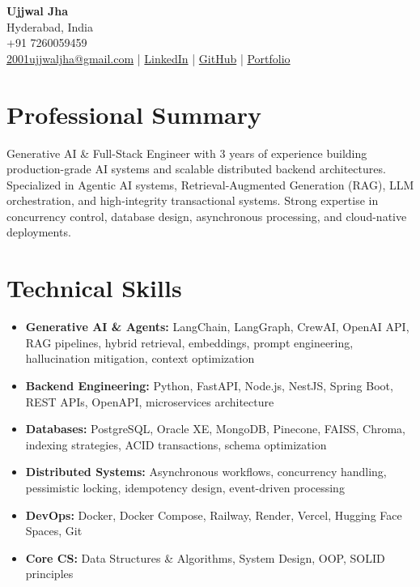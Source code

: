 \documentclass[letterpaper,11pt]{article}
\begin{document}

\begin{center}
    {\Huge \textbf{Ujjwal Jha}} \\ \vspace{6pt}
    Hyderabad, India \\
    +91 7260059459 \\
    \href{mailto:2001ujjwaljha@gmail.com}{2001ujjwaljha@gmail.com} \quad | \quad
    \href{https://www.linkedin.com/in/ujjwal-jha-8937b6218/}{LinkedIn} \quad | \quad
    \href{https://github.com/Ujjuanku}{GitHub} \quad | \quad
    \href{https://portfolio-frontend-eight-beige.vercel.app}{Portfolio}
\end{center}

\section{Professional Summary}

Generative AI \& Full-Stack Engineer with 3 years of experience building production-grade AI systems and scalable distributed backend architectures. Specialized in Agentic AI systems, Retrieval-Augmented Generation (RAG), LLM orchestration, and high-integrity transactional systems. Strong expertise in concurrency control, database design, asynchronous processing, and cloud-native deployments.

\section{Technical Skills}

\begin{itemize}

\item \textbf{Generative AI \& Agents:} LangChain, LangGraph, CrewAI, OpenAI API, RAG pipelines, hybrid retrieval, embeddings, prompt engineering, hallucination mitigation, context optimization

\item \textbf{Backend Engineering:} Python, FastAPI, Node.js, NestJS, Spring Boot, REST APIs, OpenAPI, microservices architecture

\item \textbf{Databases:} PostgreSQL, Oracle XE, MongoDB, Pinecone, FAISS, Chroma, indexing strategies, ACID transactions, schema optimization

\item \textbf{Distributed Systems:} Asynchronous workflows, concurrency handling, pessimistic locking, idempotency design, event-driven processing

\item \textbf{DevOps:} Docker, Docker Compose, Railway, Render, Vercel, Hugging Face Spaces, Git

\item \textbf{Core CS:} Data Structures \& Algorithms, System Design, OOP, SOLID principles

\end{itemize}
\end{document}
